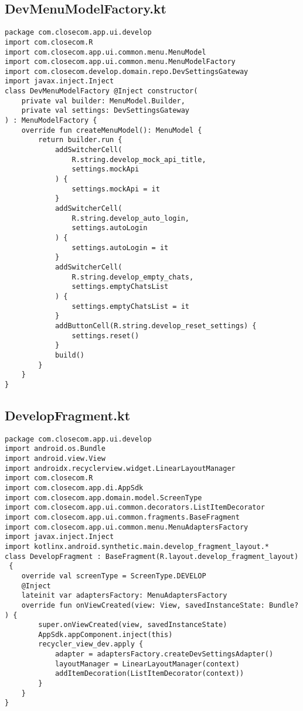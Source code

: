 \documentclass[listing]{espd}
\begin{document}
\subsection{DevMenuModelFactory.kt}
\begin{verbatim}
package com.closecom.app.ui.develop
import com.closecom.R
import com.closecom.app.ui.common.menu.MenuModel
import com.closecom.app.ui.common.menu.MenuModelFactory
import com.closecom.develop.domain.repo.DevSettingsGateway
import javax.inject.Inject
class DevMenuModelFactory @Inject constructor(
    private val builder: MenuModel.Builder,
    private val settings: DevSettingsGateway
) : MenuModelFactory {
    override fun createMenuModel(): MenuModel {
        return builder.run {
            addSwitcherCell(
                R.string.develop_mock_api_title,
                settings.mockApi
            ) {
                settings.mockApi = it
            }
            addSwitcherCell(
                R.string.develop_auto_login,
                settings.autoLogin
            ) {
                settings.autoLogin = it
            }
            addSwitcherCell(
                R.string.develop_empty_chats,
                settings.emptyChatsList
            ) {
                settings.emptyChatsList = it
            }
            addButtonCell(R.string.develop_reset_settings) {
                settings.reset()
            }
            build()
        }
    }
}
\end{verbatim}

\subsection{DevelopFragment.kt}
\begin{verbatim}
package com.closecom.app.ui.develop
import android.os.Bundle
import android.view.View
import androidx.recyclerview.widget.LinearLayoutManager
import com.closecom.R
import com.closecom.app.di.AppSdk
import com.closecom.app.domain.model.ScreenType
import com.closecom.app.ui.common.decorators.ListItemDecorator
import com.closecom.app.ui.common.fragments.BaseFragment
import com.closecom.app.ui.common.menu.MenuAdaptersFactory
import javax.inject.Inject
import kotlinx.android.synthetic.main.develop_fragment_layout.*
class DevelopFragment : BaseFragment(R.layout.develop_fragment_layout)
 {
    override val screenType = ScreenType.DEVELOP
    @Inject
    lateinit var adaptersFactory: MenuAdaptersFactory
    override fun onViewCreated(view: View, savedInstanceState: Bundle?
) {
        super.onViewCreated(view, savedInstanceState)
        AppSdk.appComponent.inject(this)
        recycler_view_dev.apply {
            adapter = adaptersFactory.createDevSettingsAdapter()
            layoutManager = LinearLayoutManager(context)
            addItemDecoration(ListItemDecorator(context))
        }
    }
}
\end{verbatim}
\end{document}
